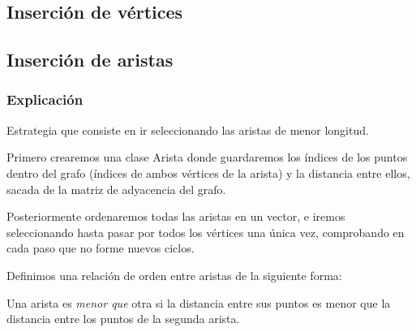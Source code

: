 

\subsection{Inserción de vértices}






















\subsection{Inserción de aristas}
\subsubsection{Explicación}

\begin{frame}
	\begin{block}{  }
	Estrategia que consiste en ir seleccionando las aristas de menor longitud.
	
	Primero crearemos una clase Arista donde guardaremos los índices de los puntos dentro 
	del grafo (índices de ambos vértices de la arista) y la distancia entre ellos, sacada 
	de la matriz de adyacencia del grafo.
	
	Posteriormente ordenaremos todas las aristas en un vector, e iremos seleccionando 
	hasta pasar por todos los vértices una única vez, comprobando en cada paso que no 
	forme nuevos ciclos.
	\end{block}
	
	\begin{block}
	Definimos una relación de orden entre aristas de la siguiente forma:

	Una arista es \textit{menor que} otra si la distancia entre sus puntos es menor que la 
	distancia entre los puntos de la segunda arista.
	\end{block}
\end{frame}

